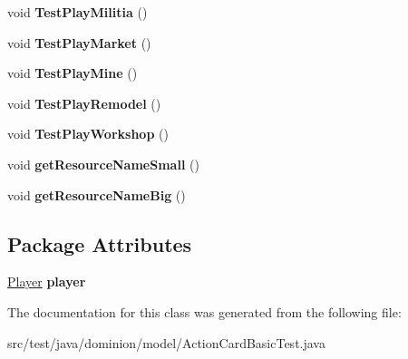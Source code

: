 \begin{DoxyCompactItemize}
\item 
\hypertarget{classdominion_1_1model_1_1ActionCardBasicTest_a58e05d7ef4c9c0e11025101cd75efd68}{void {\bfseries \-Test\-Play\-Militia} ()}\label{classdominion_1_1model_1_1ActionCardBasicTest_a58e05d7ef4c9c0e11025101cd75efd68}

\item 
\hypertarget{classdominion_1_1model_1_1ActionCardBasicTest_ab3cb5ca4d2f03d0d8ab68974f1c2f291}{void {\bfseries \-Test\-Play\-Market} ()}\label{classdominion_1_1model_1_1ActionCardBasicTest_ab3cb5ca4d2f03d0d8ab68974f1c2f291}

\item 
\hypertarget{classdominion_1_1model_1_1ActionCardBasicTest_ab97a022ab53fee6616d4cd4ab0baccc7}{void {\bfseries \-Test\-Play\-Mine} ()}\label{classdominion_1_1model_1_1ActionCardBasicTest_ab97a022ab53fee6616d4cd4ab0baccc7}

\item 
\hypertarget{classdominion_1_1model_1_1ActionCardBasicTest_aff330fd8f4e5ea85dec557a74b9b03e5}{void {\bfseries \-Test\-Play\-Remodel} ()}\label{classdominion_1_1model_1_1ActionCardBasicTest_aff330fd8f4e5ea85dec557a74b9b03e5}

\item 
\hypertarget{classdominion_1_1model_1_1ActionCardBasicTest_a34bef1e90dd971de3cb066054ea2a20a}{void {\bfseries \-Test\-Play\-Workshop} ()}\label{classdominion_1_1model_1_1ActionCardBasicTest_a34bef1e90dd971de3cb066054ea2a20a}

\item 
\hypertarget{classdominion_1_1model_1_1ActionCardBasicTest_a4c8e28b0d666e5377e30372c793d771c}{void {\bfseries get\-Resource\-Name\-Small} ()}\label{classdominion_1_1model_1_1ActionCardBasicTest_a4c8e28b0d666e5377e30372c793d771c}

\item 
\hypertarget{classdominion_1_1model_1_1ActionCardBasicTest_a2ded681563c6a2b895a18d5aa2b18cd8}{void {\bfseries get\-Resource\-Name\-Big} ()}\label{classdominion_1_1model_1_1ActionCardBasicTest_a2ded681563c6a2b895a18d5aa2b18cd8}

\end{DoxyCompactItemize}
\subsection*{\-Package \-Attributes}
\begin{DoxyCompactItemize}
\item 
\hypertarget{classdominion_1_1model_1_1ActionCardBasicTest_a31a9473c92ff02a8e8da1da42015d7d9}{\hyperlink{interfacedominion_1_1model_1_1Player}{\-Player} {\bfseries player}}\label{classdominion_1_1model_1_1ActionCardBasicTest_a31a9473c92ff02a8e8da1da42015d7d9}

\end{DoxyCompactItemize}


\-The documentation for this class was generated from the following file\-:\begin{DoxyCompactItemize}
\item 
src/test/java/dominion/model/\-Action\-Card\-Basic\-Test.\-java\end{DoxyCompactItemize}
